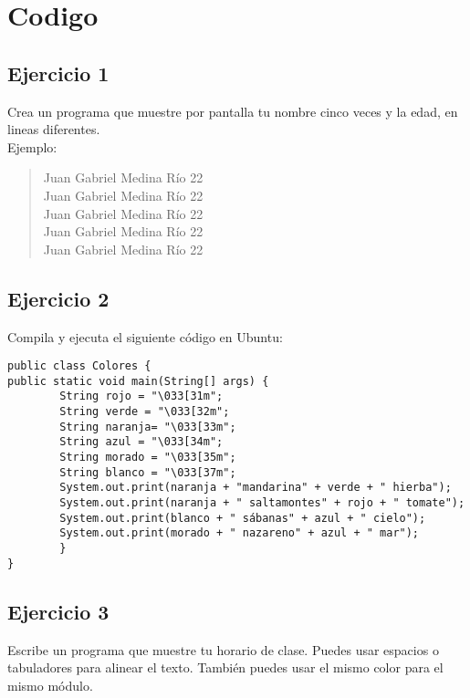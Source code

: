 \documentclass[4paper]{article}
\begin{document}
\section{Codigo}
\subsection{Ejercicio 1}
Crea un programa que muestre por pantalla tu nombre cinco veces y la edad, en lineas diferentes.\\
Ejemplo:
\begin{verse}
Juan Gabriel Medina Río 22\\
Juan Gabriel Medina Río 22\\
Juan Gabriel Medina Río 22\\
Juan Gabriel Medina Río 22\\
Juan Gabriel Medina Río 22\\
\end{verse}
\subsection{Ejercicio 2}
Compila y ejecuta el siguiente código en Ubuntu:
\begin{verbatim}
public class Colores {
public static void main(String[] args) {
        String rojo = "\033[31m";
        String verde = "\033[32m";
        String naranja= "\033[33m";
        String azul = "\033[34m";
        String morado = "\033[35m";
        String blanco = "\033[37m";
        System.out.print(naranja + "mandarina" + verde + " hierba");
        System.out.print(naranja + " saltamontes" + rojo + " tomate");
        System.out.print(blanco + " sábanas" + azul + " cielo");
        System.out.print(morado + " nazareno" + azul + " mar");
        }
}
\end{verbatim}
\subsection{Ejercicio 3}
Escribe un programa que muestre tu horario de clase. Puedes usar espacios o tabuladores para alinear el texto. También puedes usar el mismo color para el mismo módulo.
\end{document}
